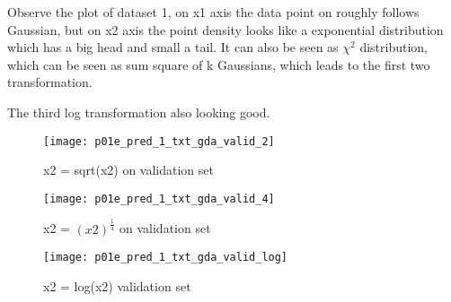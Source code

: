 \begin{answer}

Observe the plot of dataset 1, on x1 axis the data point
on roughly follows Gaussian, but on x2 axis the point density 
looks like a exponential distribution which has a big head
and small a tail. It can also be seen as $\chi^2$ distribution,
which can be seen as sum square of k Gaussians,  which leads to the 
first two transformation. 

The third log transformation also looking good.

    \begin{figure}[h]
        \centering
        \texttt{[image: p01e\_pred\_1\_txt\_gda\_valid\_2]}
        \caption{ x2 = sqrt(x2) on validation set}
    \end{figure}
    
    \begin{figure}[h]
        \centering
        \texttt{[image: p01e\_pred\_1\_txt\_gda\_valid\_4]}
        \caption{ x2 = $(x2)^{\frac{1}{4}}$ on validation set }
    \end{figure}
    
    \begin{figure}[h]
        \centering
        \texttt{[image: p01e\_pred\_1\_txt\_gda\_valid\_log]}
        \caption{ x2 = log(x2) validation set }
    \end{figure}

\end{answer}
